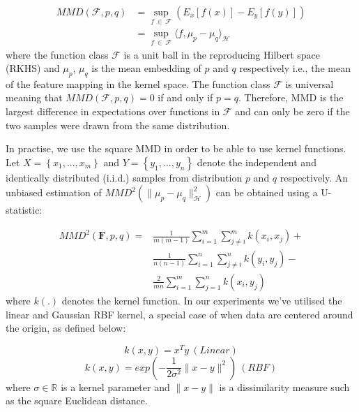 \documentclass{mpaper}
\begin{document}
\begin{equation}
\begin{aligned}
    	MMD\left( \boldsymbol{\mathcal{F}},p, q \right) & = \sup_{f\ \in\ \boldsymbol{\mathcal{F}}} {\left( E_x \left[ f\left( x \right) \right] -E_y \left[ f \left( y \right) \right] \right)} \\
    	& = {\sup_{f\ \in\ \boldsymbol{\mathcal{F}}}{\langle f,\mu_p-\mu_q\rangle_{\boldsymbol{\mathcal{H}}}}}
\end{aligned}
\end{equation}
where the function class $\boldsymbol{\mathcal{F}}$ is a unit ball in the reproducing Hilbert space (RKHS) and $\mu_p$, $\mu_q$ is the mean embedding of $p$ and $q$ respectively i.e., the mean of the feature mapping in the kernel space. The function class $\boldsymbol{\mathcal{F}}$ is universal meaning that $MMD\left(\boldsymbol{\mathcal{F}},p,q\right)=0$ if and only if $p=q$. Therefore, MMD is the largest difference in expectations over functions in $\boldsymbol{\mathcal{F}}$ and can only be zero if the two samples were drawn from the same distribution.

In practise, we use the square MMD in order to be able to use kernel functions. Let $X=\left\{x_1,...,x_m\right\}$ and $Y=\left\{y_1,...,y_n\right\}$ denote the independent and identically distributed (i.i.d.) samples from distribution $p$ and $q$ respectively. An unbiased estimation of $MMD^2 \left( \parallel{\mu_p-\mu_q}\parallel^2_{\boldsymbol{\mathcal{H}}} \right)$ can be obtained using a U-statistic:

\begin{equation}
\begin{aligned}
	MMD^2\left(\mathbf{F},p,q\right) = &\frac{1}{m(m-1)}\sum_{i=1}^{m}\sum_{j\neq i}^{m}k\left(x_i,x_j\right) + \\
	& \frac{1}{n(n-1)}\sum_{i=1}^{n}\sum_{j\neq i}^{n}k\left(y_i,y_j\right) - \\
	& \frac{2}{mn}\sum_{i=1}^{m}\sum_{j=1}^{n}k\left(x_i,y_j\right) 
\end{aligned}
\end{equation}
where $k(.)$ denotes the kernel function. In our experiments we've utilised the linear and Gaussian RBF kernel, a special case of when data are centered around the origin, as defined below:

\begin{equation}\label{eqn:linear}
    k(x,y) = x^Ty\ (Linear)
\end{equation}
\begin{equation}\label{eqn:rbf}
    k(x,y) = exp\left(-\frac{1}{2\sigma^2}\parallel x - y \parallel^2\right)\ (RBF)
\end{equation}
where $\sigma \in \mathbb{R}$ is a kernel parameter and $\parallel x - y\parallel$ is a dissimilarity measure such as the square Euclidean distance. 
\end{document}
